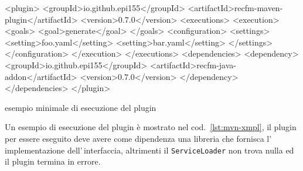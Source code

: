 \documentclass[a4paper,10pt]{report}
\newif\ifesource
\newenvironment{elisting}[1][H]
  {\captionsetup{aboveskip=0pt}\begin{listing}[#1]}
  {\end{listing}%
}
\begin{document}

\ifesource
\begin{figure*}[!htb]
\begin{lstlisting}[language=XML, caption=esempio minimale di esecuzione del 
plugin, label=lst:mvn-xmpl]
<plugin>
    <groupId>io.github.epi155</groupId>
    <artifactId>recfm-maven-plugin</artifactId>
    <version>0.7.0</version>
    <executions>
        <execution>
            <goals>
                <goal>generate</goal>
            </goals>
            <configuration>
                <settings>
                    <setting>foo.yaml</setting>
                    <setting>bar.yaml</setting>
                </settings>
            </configuration>
        </execution>
    </executions>
    <dependencies>
        <dependency>
            <groupId>io.github.epi155</groupId>
            <artifactId>recfm-java-addon</artifactId>
            <version>0.7.0</version>
        </dependency>
    </dependencies>
</plugin>
\end{lstlisting}
\end{figure*}
\else
\begin{elisting}[!htb]
\begin{xmlcode}
<plugin>
    <groupId>io.github.epi155</groupId>
    <artifactId>recfm-maven-plugin</artifactId>
    <version>0.7.0</version>
    <executions>
        <execution>
            <goals>
                <goal>generate</goal>
            </goals>
            <configuration>
                <settings>
                    <setting>foo.yaml</setting>
                    <setting>bar.yaml</setting>
                </settings>
            </configuration>
        </execution>
    </executions>
    <dependencies>
        <dependency>
            <groupId>io.github.epi155</groupId>
            <artifactId>recfm-java-addon</artifactId>
            <version>0.7.0</version>
        </dependency>
    </dependencies>
</plugin>
\end{xmlcode}
\caption{esempio minimale di esecuzione del plugin}
\label{lst:mvn-xmpl}
\end{elisting}
\fi
Un esempio di esecuzione del plugin è mostrato nel cod.~\ref{lst:mvn-xmpl},
il plugin per essere eseguito deve avere come dipendenza una libreria che 
fornisca l'\,implementazione dell'\,inter\-fac\-cia, altrimenti il 
\verb!ServiceLoader! non trova nulla ed il plugin termina in errore.
\end{document}
